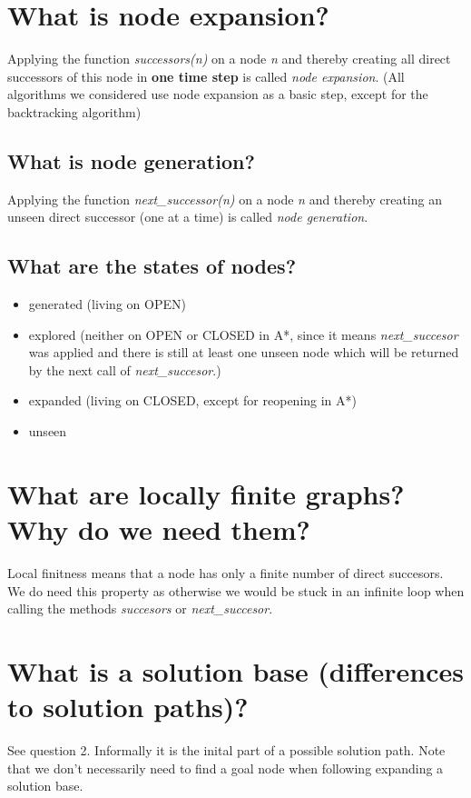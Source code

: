 \documentclass[12pt, a4paper]{article}
\begin{document}
\section{What is node expansion?}
Applying the function \textit{successors(n)} on a node \textit{n} and thereby creating all direct successors of this node in \textbf{one time step} is called \textit{node expansion}. (All algorithms we considered use node expansion as a basic step, except for the backtracking algorithm)
\subsection*{What is node generation?}
Applying the function \textit{next\_successor(n)} on a node \textit{n} and thereby creating an unseen direct successor (one at a time) is called \textit{node generation}.
\subsection*{What are the states of nodes?} \begin{itemize}
\item generated (living on OPEN)
\item explored (neither on OPEN or CLOSED in A*, since it means \textit{next\_succesor} was applied and there is still at least one unseen node which will be returned by the next call of \textit{next\_succesor}.)
\item expanded (living on CLOSED, except for reopening in A*)
\item unseen
\end{itemize}

\section{What are locally finite graphs? Why do we need them?}
Local finitness means that a node has only a finite number of direct succesors. We do need this property as otherwise we would be stuck in an infinite loop when calling the methods \textit{succesors} or \textit{next\_succesor}.

\section{What is a solution base (differences to solution paths)?}
See question 2. Informally it is the inital part of a possible solution path. Note that we don't necessarily need to find a goal node when following expanding a solution base.
\end{document}
